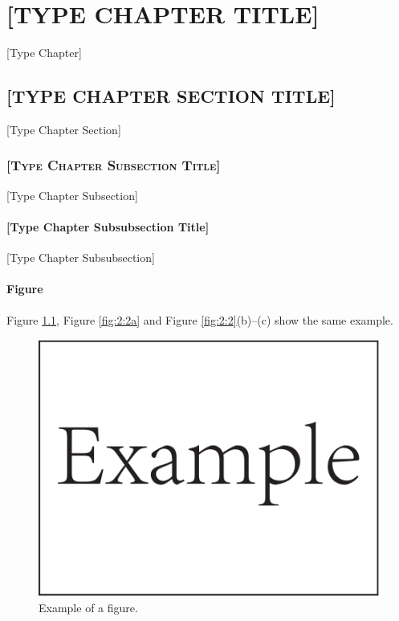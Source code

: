 \chapter{\MakeUppercase{[Type Chapter Title]}}
[Type Chapter]
\section{\MakeUppercase{[Type Chapter Section Title]}}
[Type Chapter Section]
\subsection{\textsc{[Type Chapter Subsection Title]}}
[Type Chapter Subsection]
\subsubsection{[Type Chapter Subsubsection Title]}
[Type Chapter Subsubsection]
\subsubsection{Figure}
Figure \ref{fig:2:1}, Figure \ref{fig:2:2a} and Figure \ref{fig:2:2}(b)--(c) show the same example.

\begin{figure}[!htb]
	\centering
	\includegraphics[width=0.9\linewidth]{Figures/Example.pdf}
	\caption{Example of a figure.}
	\label{fig:2:1}
\end{figure}

